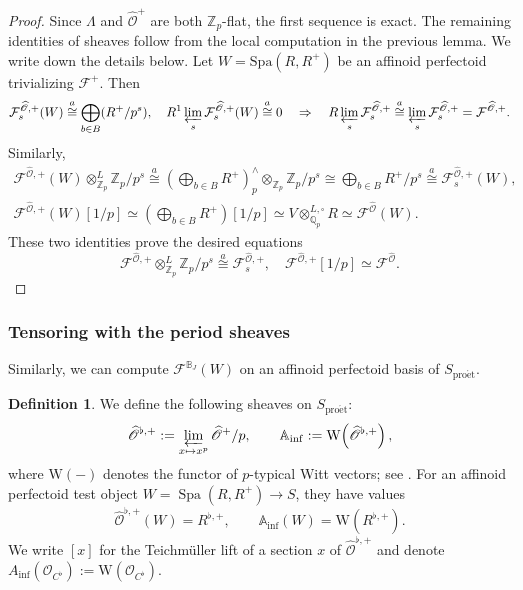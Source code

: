 \documentclass[11pt]{article}
\theoremstyle{definition}
\newtheorem{definition}[theorem]{Definition}
\newcommand{\Qp}{\mathbb Q_p}
\newcommand{\Zp}{\mathbb Z_p}
\newcommand{\cO}{\mathcal O}
\newcommand{\cF}{\mathcal F}
\newcommand{\proet}{\mathrm{pro\acute et}}
\newcommand{\acong}{\mathrel{\overset{a}{\cong}}}
\begin{document}
\begin{proof}
      Since $\Lambda$ and $\widehat{\mathscr O}^+$ are both $\Zp$-flat, the first sequence is exact.
      The remaining identities of sheaves follow from the local computation in the previous lemma. We write down the details below. 
      Let $W=\mathrm{Spa}(R, R^+)$ be an affinoid perfectoid trivializing $\cF^+$. Then
      \[\cF_s^{\widehat{\mathscr{O}},+}(W)\acong\bigoplus_{b\in B}(R^+/p^s),\quad R^1\varprojlim_s\cF_s^{\widehat{\mathscr{O}},+}(W)\acong0\quad\Rightarrow\quad R\varprojlim_s\cF_s^{\widehat{\mathscr{O}}, +}\acong\varprojlim_{s}\cF_s^{\widehat{\mathscr{O}}, +}=\cF^{\widehat{\mathscr{O}},+}.\]
      Similarly, \[\begin{aligned}
      \cF^{\widehat{\mathscr{O}},+}(W)\otimes_{\Zp}^L\Zp/p^s\acong(\bigoplus_{b\in B}R^+)^{\wedge}_p\otimes_{\Zp}\Zp/p^s\cong\bigoplus_{b\in B}R^+/p^s\acong\cF_s^{\widehat{\mathscr{O}},+}(W),\\ 
      \cF^{\widehat{\mathscr{O}},+}(W)[1/p]\simeq(\bigoplus_{b\in B}R^+)[1/p]\simeq V\otimes_{\Qp}^{L,\square}R\simeq\cF^{\widehat{\mathscr{O}}}(W).
      \end{aligned}\]
      These two identities prove the desired equations\[\mathcal F^{\widehat{\mathscr O},+}
 \otimes_{\Zp}^L\Zp/p^s
 \acong\mathcal F_s^{\widehat{\mathscr O},+},\quad
 \mathcal F^{\widehat{\mathscr O},+}[1/p]
 \simeq\mathcal F^{\widehat{\mathscr O}}.\]
\end{proof}


\subsubsection{Tensoring with the period sheaves}
Similarly, we can compute $\cF^{\mathbb{B}_J}(W)$ on an affinoid perfectoid basis of $S_{\proet}$.
\begin{definition}%
\label{def:Fontaine-Ainf-sheaf}
We define the following sheaves on \(S_{\proet}\):
\[
 \widehat{\mathscr O}^{\flat,+}
 :=\varprojlim_{x\mapsto x^p}\widehat{\mathscr O}^{+}/p,
 \qquad
 \mathbb A_{\inf}
 :=\mathrm W\!\left(\widehat{\mathscr O}^{\flat,+}\right),
\]
where \(\mathrm W(-)\) denotes the functor of \(p\)-typical Witt
vectors; see \cite[Definition~6.1]{ScholzeRigid}.
For an affinoid perfectoid test object
\(W=\operatorname{Spa}(R,R^+)\to S\), they have values
\[
 \widehat{\mathscr O}^{\flat,+}(W)=R^{\flat,+},
 \qquad
 \mathbb A_{\inf}(W)=\mathrm W(R^{\flat,+}).
\]
We write \([x]\) for the Teichm\"uller lift of a section
\(x\) of \(\widehat{\mathscr O}^{\flat,+}\) and denote 
\(A_{\inf}(\cO_{C^\flat}):=\mathrm W(\cO_{C^\flat})\).
\end{definition}
\end{document}
